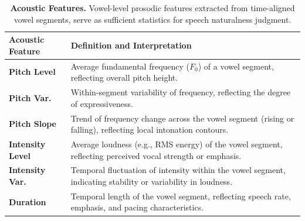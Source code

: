 \begin{table}[h]
\centering
\renewcommand{\arraystretch}{1.2}
\setlength{\tabcolsep}{10pt}
\footnotesize
\caption{\textbf{Acoustic Features.}
Vowel-level prosodic features extracted from time-aligned vowel segments, serve as sufficient statistics for speech naturalness judgment.}
\vspace{-0.6em}

\begin{tabular}{p{2.2cm} p{12.6cm}}
\toprule
\textbf{Acoustic Feature} & \textbf{Definition and Interpretation} \\
\midrule
\textbf{Pitch Level} &
Average fundamental frequency ($F_0$) of a vowel segment, reflecting overall pitch height. \\

\textbf{Pitch Var.} &
Within-segment variability of frequency, reflecting the degree of expressiveness. \\

\textbf{Pitch Slope} &
Trend of frequency change across the vowel segment (rising or falling), reflecting local intonation contours. \\

\textbf{Intensity Level} &
Average loudness (e.g., RMS energy) of the vowel segment, reflecting perceived vocal strength or emphasis. \\

\textbf{Intensity Var.} &
Temporal fluctuation of intensity within the vowel segment, indicating stability or variability in loudness. \\

\textbf{Duration} &
Temporal length of the vowel segment, reflecting speech rate, emphasis, and pacing characteristics. \\

\bottomrule
\end{tabular}
\label{table:acoustic-features}
\vspace{-0.5em}
\end{table}


